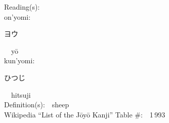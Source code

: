 \begin{multicols}{2}
Reading(s):\ \ \\
{\hspace*{1em}}on'yomi:\ \ \\
{\hspace*{2em}}{\begin{CJK}{UTF8}{min} ヨウ \end{CJK}}\ \ y\=o\ \ \\
{\hspace*{1em}}kun'yomi:\ \ \\
{\hspace*{2em}}{\begin{CJK}{UTF8}{min} ひつじ \end{CJK}}\ \ hitsuji\ \ \\
Definition(s):\ \ sheep \\
Wikipedia ``List of the J\=oy\=o Kanji'' Table \#:\ \ 1\,993 \\
\ \ \\
\end{multicols}



